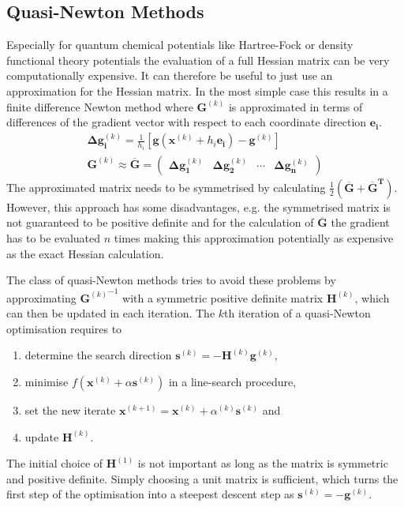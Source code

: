\subsection{Quasi-Newton Methods}
\label{sec:QuasiNewtonMethods}

Especially for quantum chemical potentials like Hartree-Fock or density
functional theory potentials the evaluation of a full Hessian matrix can be
very computationally expensive. It can therefore be useful to just use an
approximation for the Hessian matrix. In the most simple case this results in a
finite difference Newton method where $\mathbf{G}^{(k)}$ is approximated in
terms of differences of the gradient vector with respect to each coordinate
direction $\mathbf{e_i}$.
%
\begin{align}
    {\bm{\Delta}\mathbf{g}}_\mathbf{i}^{(k)}=\frac{1}{h_i}\left[\mathbf{g}\left(\mathbf{x}^{(k)}+h_i\mathbf{e_i}\right)-\mathbf{g}^{(k)}\right]\\
    \mathbf{G}^{(k)}\approx \mathbf{\overline{G}}=
    \begin{pmatrix}
        \bm{\Delta}\mathbf{g}_\mathbf{1}^{(k)} & \bm{\Delta}\mathbf{g}_\mathbf{2}^{(k)} & \cdots & \bm{\Delta}\mathbf{g}_\mathbf{n}^{(k)}
    \end{pmatrix}
\end{align}
%
The approximated matrix needs to be symmetrised by calculating
$\frac{1}{2}\left(\mathbf{\overline{G}}+\mathbf{\overline{G}^T}\right)$. However, this
approach has some disadvantages, e.g. the symmetrised matrix is not guaranteed
to be positive definite and for the calculation of $\mathbf{\overline{G}}$ the
gradient has to be evaluated $n$ times making this approximation potentially as
expensive as the exact Hessian calculation.

The class of quasi-Newton methods tries to avoid these problems by
approximating ${\mathbf{G}^{(k)}}^{-1}$ with a symmetric positive definite
matrix $\mathbf{H}^{(k)}$, which can then be updated in each iteration. The $k$th
iteration of a quasi-Newton optimisation requires to
%
\begin{enumerate}
    \item determine the search direction $\mathbf{s}^{(k)}=-\mathbf{H}^{(k)}\mathbf{g}^{(k)}$,
    \item minimise $f\left(\mathbf{x}^{(k)}+\alpha\mathbf{s}^{(k)}\right)$ in a line-search procedure,
    \item set the new iterate $\mathbf{x}^{(k+1)}=\mathbf{x}^{(k)}+\alpha^{(k)}\mathbf{s}^{(k)}$ and
    \item update $\mathbf{H}^{(k)}$.
\end{enumerate}
%
The initial choice of $\mathbf{H}^{(1)}$ is not important as long as the matrix
is symmetric and positive definite. Simply choosing a unit matrix is sufficient,
which turns the first step of the optimisation into a steepest descent step as
$\mathbf{s}^{(k)}=-\mathbf{g}^{(k)}$.

